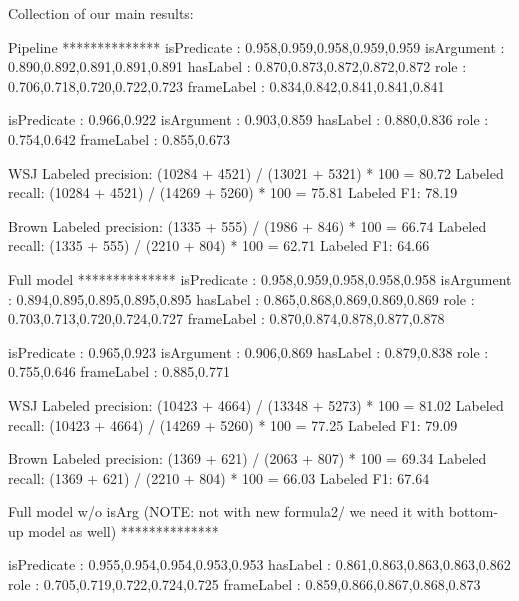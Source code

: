 


Collection of our main results:

Pipeline
**************
         isPredicate    : 0.958,0.959,0.958,0.959,0.959
          isArgument    : 0.890,0.892,0.891,0.891,0.891
            hasLabel    : 0.870,0.873,0.872,0.872,0.872
                role    : 0.706,0.718,0.720,0.722,0.723
          frameLabel    : 0.834,0.842,0.841,0.841,0.841


         isPredicate    : 0.966,0.922
          isArgument    : 0.903,0.859
            hasLabel    : 0.880,0.836
                role    : 0.754,0.642
          frameLabel    : 0.855,0.673

WSJ
  Labeled precision:          (10284 + 4521) / (13021 + 5321) * 100 = 80.72 %
  Labeled recall:             (10284 + 4521) / (14269 + 5260) * 100 = 75.81 %
  Labeled F1:                 78.19

Brown
  Labeled precision:          (1335 + 555) / (1986 + 846) * 100 = 66.74 %
  Labeled recall:             (1335 + 555) / (2210 + 804) * 100 = 62.71 %
  Labeled F1:                 64.66



Full model
**************
         isPredicate    : 0.958,0.959,0.958,0.958,0.958
          isArgument    : 0.894,0.895,0.895,0.895,0.895
            hasLabel    : 0.865,0.868,0.869,0.869,0.869
                role    : 0.703,0.713,0.720,0.724,0.727
          frameLabel    : 0.870,0.874,0.878,0.877,0.878

         isPredicate    : 0.965,0.923
          isArgument    : 0.906,0.869
            hasLabel    : 0.879,0.838
                role    : 0.755,0.646
          frameLabel    : 0.885,0.771

WSJ
  Labeled precision:          (10423 + 4664) / (13348 + 5273) * 100 = 81.02 %
  Labeled recall:             (10423 + 4664) / (14269 + 5260) * 100 = 77.25 %
  Labeled F1:                 79.09

Brown
  Labeled precision:          (1369 + 621) / (2063 + 807) * 100 = 69.34 %
  Labeled recall:             (1369 + 621) / (2210 + 804) * 100 = 66.03 %
  Labeled F1:                 67.64


Full model w/o isArg (NOTE: not with new formula2/ we need it with bottom-up model as well)
**************

         isPredicate    : 0.955,0.954,0.954,0.953,0.953
            hasLabel    : 0.861,0.863,0.863,0.863,0.862
                role    : 0.705,0.719,0.722,0.724,0.725
          frameLabel    : 0.859,0.866,0.867,0.868,0.873

